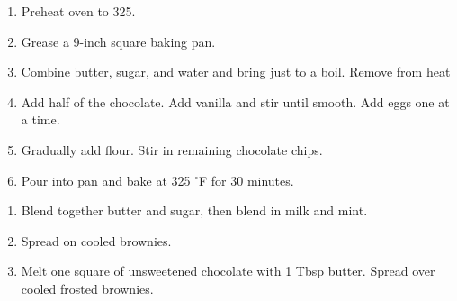 

\begin{ingredients}
\end{ingredients}


\begin{recipe}
  \begin{enumerate}

  \item Preheat oven to 325\F.

  \item Grease a 9-inch square baking pan.

  \item Combine butter, sugar, and water and bring just to a boil.  Remove from heat

  \item Add half of the chocolate.  Add vanilla and stir until smooth.
    Add eggs one at a time.

  \item Gradually add flour.  Stir in remaining
    chocolate chips.

  \item Pour into pan and bake at 325 $^\circ$F for 30 minutes.

  \end{enumerate}
\end{recipe}



\begin{ingredients}
\end{ingredients}


\begin{recipe}
  \begin{enumerate}

  \item Blend together butter and sugar, then blend in milk and mint.

  \item Spread on cooled brownies.

  \item Melt one square of unsweetened chocolate with 1 Tbsp butter.
    Spread over cooled frosted brownies.

  \end{enumerate}
\end{recipe}


